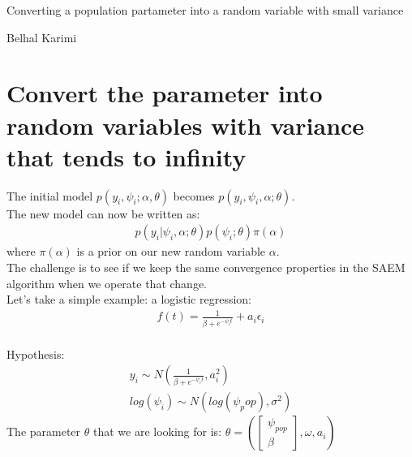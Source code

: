 \documentclass[a4paper]{article}
\begin{document}

\Large
 \begin{center}
Converting a population partameter into a random variable with small variance

\hspace{10pt}

\large
Belhal Karimi

\hspace{10pt}

\end{center}

\hspace{10pt}

\normalsize



\section{Convert the parameter into random variables with variance that tends to infinity}
The initial model $p(y_i, \psi_i;\alpha,\theta)$ becomes $p(y_i, \psi_i,\alpha;\theta)$.\\

The new model can now be written as:\\
\begin{align}
p(y_i| \psi_i,\alpha;\theta)p(\psi_i;\theta)\pi(\alpha)
\end{align}
where $\pi(\alpha)$ is a prior on our new random variable $\alpha$.\\
The challenge is to see if we keep the same convergence properties in the SAEM algorithm when we operate that change.\\

Let's take a simple example: a logistic regression:
\begin{align}
f(t) = \frac{1}{\beta+e^{-\psi_i t}} + a_i\epsilon_i
\end{align}\\
Hypothesis:\\

\begin{align}
 y_i \sim N(\frac{1}{\beta+e^{-\psi_i t}},a_i^{2})\\
 log(\psi_i) \sim N(log(\psi_pop),\sigma^{2})
\end{align}
The parameter $\theta$ that we are looking for is: $\theta = (\begin{bmatrix}
           \psi_{pop}\\
           \beta
         \end{bmatrix}, \omega, a_i)$\\
\end{document}
